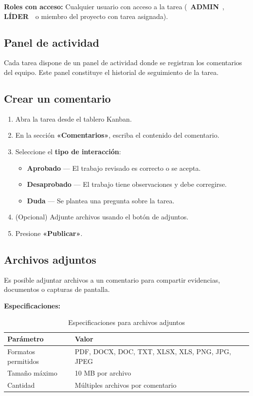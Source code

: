 \documentclass[12pt, a4paper]{article}
\newcommand{\rolbadge}[2]{%
  \colorbox{#1}{\color{white}\footnotesize\bfseries\,#2\,}%
}
\newcommand{\admin}{\rolbadge{admincolor}{ADMIN}}
\newcommand{\leader}{\rolbadge{leadercolor}{LÍDER}}
\begin{document}
\begin{notebox}
\textbf{Roles con acceso:} Cualquier usuario con acceso a la tarea (\admin, \leader\ o miembro del proyecto con tarea asignada).
\end{notebox}

\subsection{Panel de actividad}

Cada tarea dispone de un panel de actividad donde se registran los comentarios del equipo. Este panel constituye el historial de seguimiento de la tarea.

\subsection{Crear un comentario}

\begin{enumerate}
  \item Abra la tarea desde el tablero Kanban.
  \item En la sección \textbf{«Comentarios»}, escriba el contenido del comentario.
  \item Seleccione el \textbf{tipo de interacción}:
  \begin{itemize}
    \item \textcolor{success}{\textbf{Aprobado}} — El trabajo revisado es correcto o se acepta.
    \item \textcolor{danger}{\textbf{Desaprobado}} — El trabajo tiene observaciones y debe corregirse.
    \item \textcolor{warning}{\textbf{Duda}} — Se plantea una pregunta sobre la tarea.
  \end{itemize}
  \item (Opcional) Adjunte archivos usando el botón de adjuntos.
  \item Presione \textbf{«Publicar»}.
\end{enumerate}

\subsection{Archivos adjuntos}

Es posible adjuntar archivos a un comentario para compartir evidencias, documentos o capturas de pantalla.

\textbf{Especificaciones:}

\begin{table}[H]
\centering
\begin{tabularx}{\textwidth}{L{3.5cm} L{9.5cm}}
\toprule
\textbf{Parámetro} & \textbf{Valor} \\
\midrule
Formatos permitidos & PDF, DOCX, DOC, TXT, XLSX, XLS, PNG, JPG, JPEG \\
Tamaño máximo       & 10 MB por archivo \\
Cantidad            & Múltiples archivos por comentario \\
\bottomrule
\end{tabularx}
\caption{Especificaciones para archivos adjuntos}
\end{table}
\end{document}
